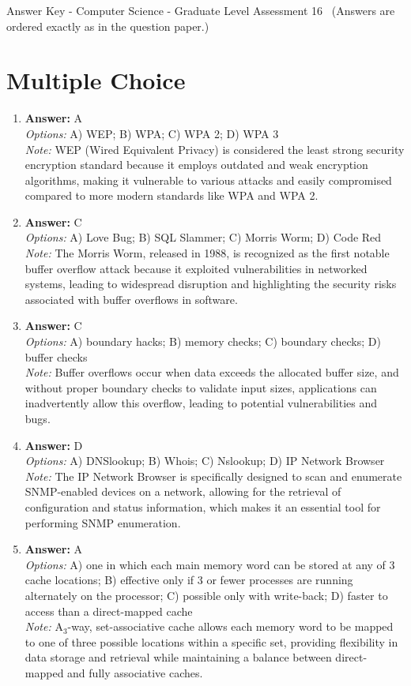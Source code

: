 \documentclass[12pt]{article}
\begin{document}
\begin{center}
Answer Key - Computer Science - Graduate Level Assessment 16 \
\small (Answers are ordered exactly as in the question paper.)
\end{center}

\section*{Multiple Choice}
\begin{enumerate}[label=\arabic*.]
\item \textbf{Answer:} A
\\ \textit{Options:} A) WEP; B) WPA; C) WPA 2; D) WPA 3
\\ \textit{Note:} WEP (Wired Equivalent Privacy) is considered the least strong security encryption standard because it employs outdated and weak encryption algorithms, making it vulnerable to various attacks and easily compromised compared to more modern standards like WPA and WPA 2.
\item \textbf{Answer:} C
\\ \textit{Options:} A) Love Bug; B) SQL Slammer; C) Morris Worm; D) Code Red
\\ \textit{Note:} The Morris Worm, released in 1988, is recognized as the first notable buffer overflow attack because it exploited vulnerabilities in networked systems, leading to widespread disruption and highlighting the security risks associated with buffer overflows in software.
\item \textbf{Answer:} C
\\ \textit{Options:} A) boundary hacks; B) memory checks; C) boundary checks; D) buffer checks
\\ \textit{Note:} Buffer overflows occur when data exceeds the allocated buffer size, and without proper boundary checks to validate input sizes, applications can inadvertently allow this overflow, leading to potential vulnerabilities and bugs.
\item \textbf{Answer:} D
\\ \textit{Options:} A) DNSlookup; B) Whois; C) Nslookup; D) IP Network Browser
\\ \textit{Note:} The IP Network Browser is specifically designed to scan and enumerate SNMP-enabled devices on a network, allowing for the retrieval of configuration and status information, which makes it an essential tool for performing SNMP enumeration.
\item \textbf{Answer:} A
\\ \textit{Options:} A) one in which each main memory word can be stored at any of 3 cache locations; B) effective only if 3 or fewer processes are running alternately on the processor; C) possible only with write-back; D) faster to access than a direct-mapped cache
\\ \textit{Note:} A$_{3}$-way, set-associative cache allows each memory word to be mapped to one of three possible locations within a specific set, providing flexibility in data storage and retrieval while maintaining a balance between direct-mapped and fully associative caches.
\end{enumerate}
\end{document}
